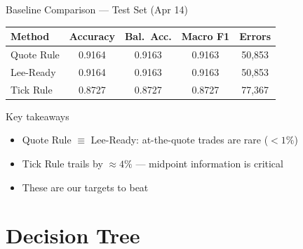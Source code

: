 \documentclass[aspectratio=169,10pt]{beamer}
\begin{document}
\begin{frame}{Baseline Comparison — Test Set (Apr 14)}
  \begin{center}
  \begin{tabular}{lcccc}
    \toprule
    \textbf{Method} & \textbf{Accuracy} & \textbf{Bal.\ Acc.} & \textbf{Macro F1} & \textbf{Errors} \\
    \midrule
    Quote Rule & 0.9164 & 0.9163 & 0.9163 & 50{,}853 \\
    Lee-Ready  & 0.9164 & 0.9163 & 0.9163 & 50{,}853 \\
    Tick Rule  & 0.8727 & 0.8727 & 0.8727 & 77{,}367 \\
    \bottomrule
  \end{tabular}
  \end{center}

  \medskip
  \begin{block}{Key takeaways}
    \begin{itemize}
      \item Quote Rule $\equiv$ Lee-Ready: at-the-quote trades are rare ($< 1\%$)
      \item Tick Rule trails by $\approx 4\%$ — midpoint information is critical
      \item These are our targets to beat
    \end{itemize}
  \end{block}
\end{frame}

\section{Decision Tree}
\end{document}
